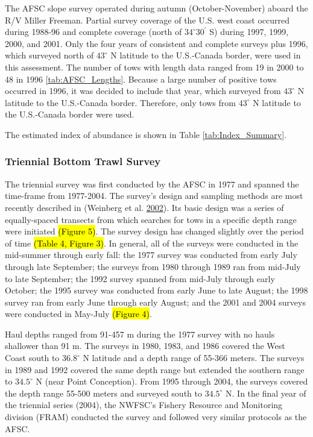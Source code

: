\documentclass[12pt,]{article}
\begin{document}
The AFSC slope survey operated during autumn (October-November) aboard
the R/V Miller Freeman. Partial survey coverage of the U.S. west coast
occurred during 1988-96 and complete coverage (north of
\(34^\circ 30^\prime\) S) during 1997, 1999, 2000, and 2001. Only the
four years of consistent and complete surveys plus 1996, which surveyed
north of \(43^\circ\) N latitude to the U.S.-Canada border, were used in
this assessment. The number of tows with length data ranged from 19 in
2000 to 48 in 1996 \ref{tab:AFSC_Lengths}. Because a large number of
positive tows occurred in 1996, it was decided to include that year,
which surveyed from \(43^\circ\) N latitude to the U.S.-Canada border.
Therefore, only tows from \(43^\circ\) N latitude to the U.S.-Canada
border were used.

The estimated index of abundance is shown in Table
\ref{tab:Index_Summary}.

\subsubsection{Triennial Bottom Trawl
Survey}\label{triennial-bottom-trawl-survey}

The triennial survey was first conducted by the AFSC in 1977 and spanned
the time-frame from 1977-2004. The survey's design and sampling methods
are most recently described in (Weinberg et al.
\protect\hyperlink{ref-weinberg_estimation_2002}{2002}). Its basic
design was a series of equally-spaced transects from which searches for
tows in a specific depth range were initiated \hl{(Figure 5)}. The
survey design has changed slightly over the period of time
\hl{(Table 4, Figure 3)}. In general, all of the surveys were conducted
in the mid-summer through early fall: the 1977 survey was conducted from
early July through late September; the surveys from 1980 through 1989
ran from mid-July to late September; the 1992 survey spanned from
mid-July through early October; the 1995 survey was conducted from early
June to late August; the 1998 survey ran from early June through early
August; and the 2001 and 2004 surveys were conducted in May-July
\hl{(Figure 4)}.

Haul depths ranged from 91-457 m during the 1977 survey with no hauls
shallower than 91 m. The surveys in 1980, 1983, and 1986 covered the
West Coast south to \(36.8^\circ\) N latitude and a depth range of
55-366 meters. The surveys in 1989 and 1992 covered the same depth range
but extended the southern range to \(34.5^\circ\) N (near Point
Conception). From 1995 through 2004, the surveys covered the depth range
55-500 meters and surveyed south to \(34.5^\circ\) N. In the final year
of the triennial series (2004), the NWFSC's Fishery Resource and
Monitoring division (FRAM) conducted the survey and followed very
similar protocols as the AFSC.
\end{document}
